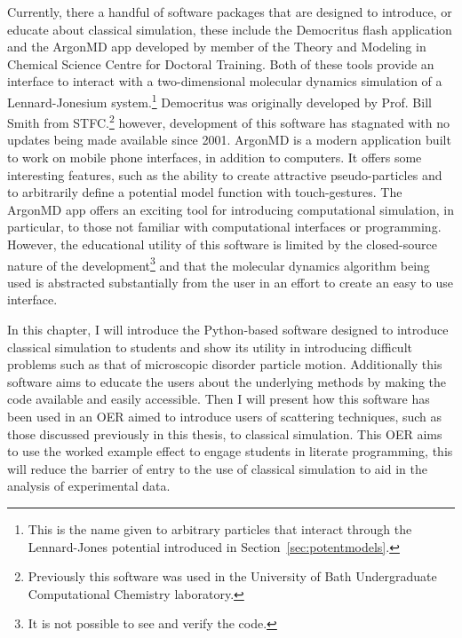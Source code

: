 Currently, there a handful of software packages that are designed to introduce, or educate about classical simulation, these include the Democritus flash application and the ArgonMD app developed by member of the Theory and Modeling in Chemical Science Centre for Doctoral Training.\autocite{noauthor_democritus_nodate,noauthor_argonmd_nodate}
Both of these tools provide an interface to interact with a two-dimensional molecular dynamics simulation of a Lennard-Jonesium system.\footnote{This is the name given to arbitrary particles that interact through the Lennard-Jones potential introduced in Section~\ref{sec:potentmodels}.}
Democritus was originally developed by Prof. Bill Smith from STFC.\footnote{Previously this software was used in the University of Bath Undergraduate Computational Chemistry laboratory.} however, development of this software has stagnated with no updates being made available since 2001.
ArgonMD is a modern application built to work on mobile phone interfaces, in addition to computers.
It offers some interesting features, such as the ability to create attractive pseudo-particles and to arbitrarily define a potential model function with touch-gestures.
The ArgonMD app offers an exciting tool for introducing computational simulation, in particular, to those not familiar with computational interfaces or programming.
However, the educational utility of this software is limited by the closed-source nature of the development\footnote{It is not possible to see and verify the code.} and that the molecular dynamics algorithm being used is abstracted substantially from the user in an effort to create an easy to use interface.

In this chapter, I will introduce the Python-based software designed to introduce classical simulation to students and show its utility in introducing difficult problems such as that of microscopic disorder particle motion.
Additionally this software aims to educate the users about the underlying methods by making the code available and easily accessible.
Then I will present how this software has been used in an OER aimed to introduce users of scattering techniques, such as those discussed previously in this thesis, to classical simulation.
This OER aims to use the worked example effect to engage students in literate programming, this will reduce the barrier of entry to the use of classical simulation to aid in the analysis of experimental data. 

